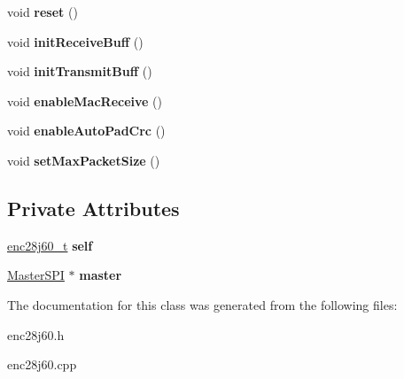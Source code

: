 \begin{DoxyCompactItemize}
void {\bfseries reset} ()
\item 
\mbox{\label{classEnc28j60_a7c5ee483693710bc8c973413e52dc5b9}} 
void {\bfseries init\+Receive\+Buff} ()
\item 
\mbox{\label{classEnc28j60_aea901773a26edf7e13a0aa249ef354d2}} 
void {\bfseries init\+Transmit\+Buff} ()
\item 
\mbox{\label{classEnc28j60_a801b7b936e24295f75a51ccce398c61c}} 
void {\bfseries enable\+Mac\+Receive} ()
\item 
\mbox{\label{classEnc28j60_a257b08a023955ade7d226e3c9a199780}} 
void {\bfseries enable\+Auto\+Pad\+Crc} ()
\item 
\mbox{\label{classEnc28j60_af4f9dbaf022b144ffea766c97630c902}} 
void {\bfseries set\+Max\+Packet\+Size} ()
\end{DoxyCompactItemize}
\subsection*{Private Attributes}
\begin{DoxyCompactItemize}
\item 
\mbox{\label{classEnc28j60_a397a8e8f650313321fad2ad320e52b9e}} 
\hyperlink{structenc28j60__t}{enc28j60\+\_\+t} {\bfseries self}
\item 
\mbox{\label{classEnc28j60_add18edc29b10e89bacc3e83ecd2b51fb}} 
\hyperlink{classMasterSPI}{Master\+S\+PI} $\ast$ {\bfseries master}
\end{DoxyCompactItemize}


The documentation for this class was generated from the following files\+:\begin{DoxyCompactItemize}
\item 
enc28j60.\+h\item 
enc28j60.\+cpp\end{DoxyCompactItemize}
